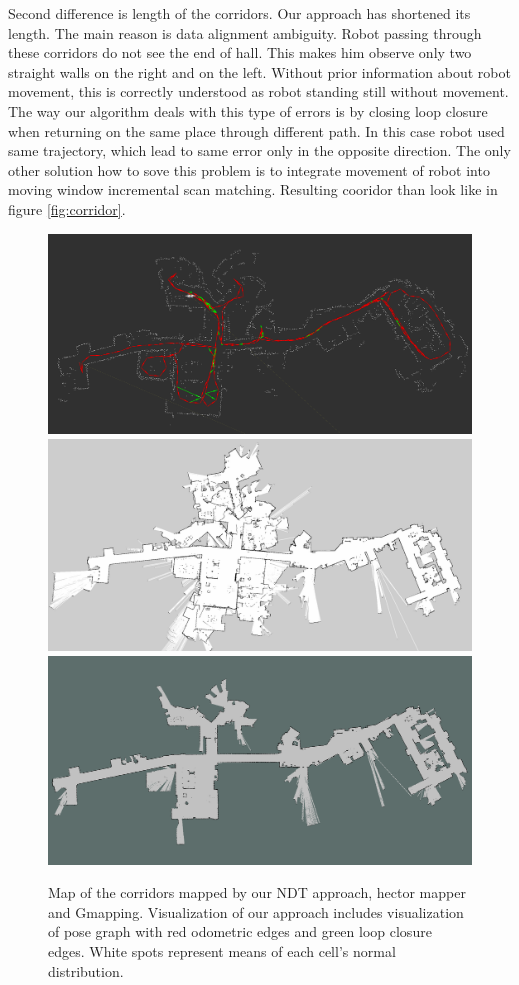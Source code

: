 Second difference is length of the corridors. Our approach has shortened its length. The main reason is data alignment ambiguity. Robot passing through these corridors do not see the end of hall. This makes him observe only two straight walls on the right and on the left. Without prior information about robot movement, this is correctly understood as robot standing still without movement. The way our algorithm deals with this type of errors is by closing loop closure when returning on the same place through different path. In this case robot used same trajectory, which lead to same error only in the opposite direction. The only other solution how to sove this problem is to integrate movement of robot into moving window incremental scan matching. Resulting cooridor than look like in figure \ref{fig:corridor}. 
\begin{figure}
	\centering
	\includegraphics[width=140mm]{../img/full_ndt.png}
	\includegraphics[width=140mm]{../img/full_hector.png}
	\includegraphics[width=140mm]{../img/full_gmapping.png}
	
	\caption{Map of the corridors mapped by our \gls{NDT} approach, hector mapper and Gmapping. Visualization of our approach includes visualization of pose graph with red odometric edges and green loop closure edges. White spots represent means of each cell's  normal distribution.}\label{fig:full_res}
\end{figure}

